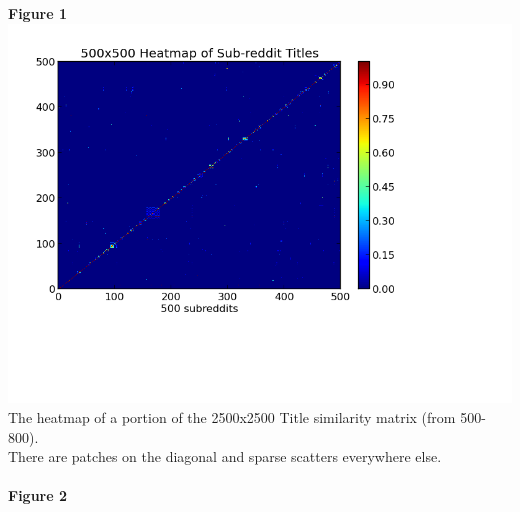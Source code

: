 \documentclass[10pt]{article}
\begin{document}
\textbf{Figure 1}\\
\includegraphics[scale=0.7]{500Heatmap.png}\\
The heatmap of a portion of the 2500x2500 Title similarity matrix (from 500-800).\\
There are patches on the diagonal and sparse scatters everywhere else.\\
\pagebreak\\
\textbf{Figure 2}\\
\end{document}
